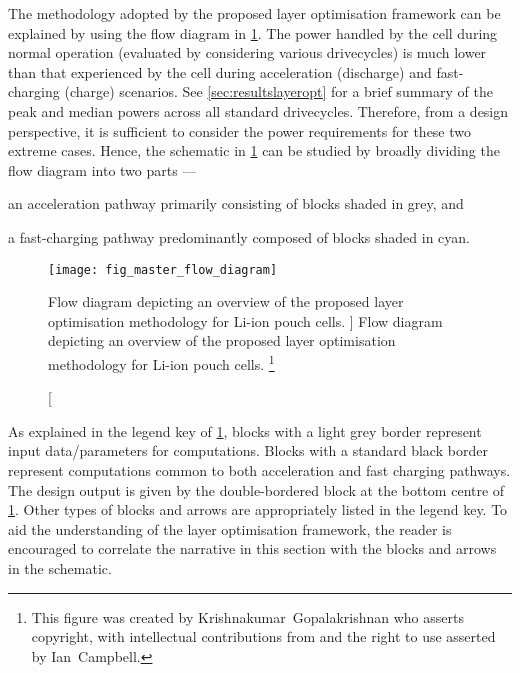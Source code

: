 

The  methodology adopted  by the  proposed layer  optimisation framework  can be
explained by  using the  flow diagram in  \cref{fig:fig_strategy_schematic}. The
power  handled by  the cell  during normal  operation (evaluated  by considering
various  drivecycles)  is   much  lower  than  that  experienced   by  the  cell
during  acceleration  (discharge)  and  fast-charging  (charge)  scenarios.  See
\cref{sec:resultslayeropt} for  a brief  summary of the  peak and  median powers
across all  standard drivecycles.  Therefore, from a  design perspective,  it is
sufficient  to consider  the power  requirements  for these  two extreme  cases.
Hence,  the schematic  in  \cref{fig:fig_strategy_schematic} can  be studied  by
broadly dividing the flow diagram into two parts ---
\begin{enumerate*}[label=\roman*)]
    \item an acceleration pathway primarily consisting of blocks shaded in grey, and
    \item a fast-charging pathway predominantly composed of blocks shaded in cyan.
\end{enumerate*}

\begin{figure}[p]
    \begin{minipage}[t]{\textwidth}
        \centering
        \texttt{[image: fig\_master\_flow\_diagram]}
        \captionsetup{labelsep=note}
        \caption
        [%
        Flow diagram depicting an overview of the proposed layer optimisation methodology
        for Li-ion pouch cells.
        ]%
        {%
            Flow diagram depicting an overview of the proposed layer optimisation methodology
            for Li-ion pouch cells.
        }%
        \label{fig:fig_strategy_schematic}
        \mpfootnotes[1]
        \vspace*{0.7225cm}
        \footnote{This figure was created by \mbox{Krishnakumar Gopalakrishnan} who
            asserts copyright, with intellectual contributions from and the right to
        use asserted by \mbox{Ian Campbell}.}
    \end{minipage}
\end{figure}

As explained in the legend key of \cref{fig:fig_strategy_schematic}, blocks with
a light  grey border  represent input  data/parameters for  computations. Blocks
with a standard black border  represent computations common to both acceleration
and fast  charging pathways. The design  output is given by  the double-bordered
block at the bottom centre  of \cref{fig:fig_strategy_schematic}. Other types of
blocks  and arrows  are  appropriately listed  in  the legend  key.  To aid  the
understanding of the  layer optimisation framework, the reader  is encouraged to
correlate  the narrative  in this  section  with the  blocks and  arrows in  the
schematic.



